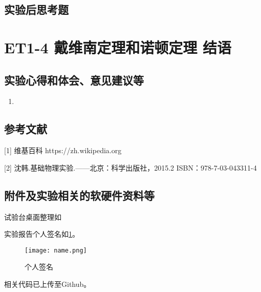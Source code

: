 \documentclass[dvipsnames, svgnames,a4paper,11pt]{article}
\begin{document}
	
	\subsection{实验后思考题}
	
	\begin{question}
		
	\end{question}
	
	\begin{question}
		
	\end{question}
	
	\begin{question}
		
	\end{question}
	
	
	
	\clearpage
	
	\section{ET1-4 戴维南定理和诺顿定理 \quad\heiti 结语}
	
	\subsection{实验心得和体会、意见建议等}
	\begin{enumerate}
		\item 
	\end{enumerate}
	
	\subsection{参考文献}
	[1] 维基百科 https://zh.wikipedia.org
	
	[2] 沈韩.基础物理实验.——北京：科学出版社，2015.2 ISBN：978-7-03-043311-4
	
	
	\subsection{附件及实验相关的软硬件资料等}
	试验台桌面整理如%
	
	实验报告个人签名如\cref{fig:name}。
	
	\begin{figure}[htbp]
		\centering
		\texttt{[image: name.png]}
		\caption{个人签名}
		\label{fig:name}
	\end{figure}
	
	
	相关代码已上传至Github。
	
	
	
\end{document}

